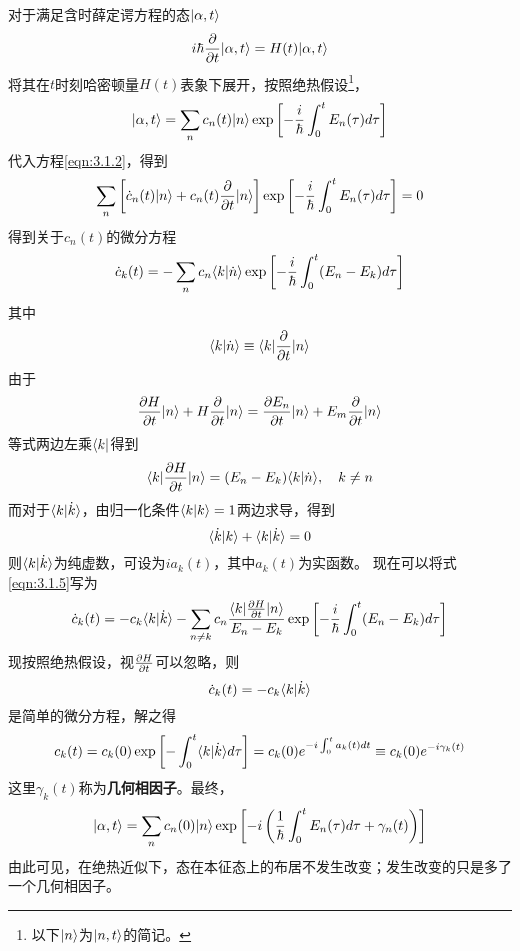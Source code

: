 对于满足含时薛定谔方程的态$ |\alpha,t\rangle $
\begin{equation}\label{eqn:3.1.2}
i\hbar\frac{\partial}{\partial t}|\alpha,t\rangle=H(t)|\alpha,t\rangle
\end{equation}
将其在$ t $时刻哈密顿量$ H(t) $表象下展开，按照绝热假设\footnote{以下$ |n\rangle $为$ |n,t\rangle $的简记。}，
\begin{equation}\label{key}
|\alpha,t\rangle=\sum_nc_n(t)|n\rangle\exp\left[-\frac{i}{\hbar}\int_0^tE_n(\tau)d\tau\right]
\end{equation}
代入方程\eqref{eqn:3.1.2}，得到
\begin{equation}\label{key}
\sum_n\left[\dot{c}_n(t)|n\rangle+c_n(t)\dfrac{\partial}{\partial t}|n\rangle\right]\exp\left[-\frac{i}{\hbar}\int_0^tE_n(\tau)d\tau\right]=0
\end{equation}
得到关于$ c_n(t) $的微分方程
\begin{equation}\label{eqn:3.1.5}
\dot{c}_k(t)=-\sum_nc_n\langle k|\dot{n}\rangle\exp\left[-\dfrac{i}{\hbar}\int_0^t(E_n-E_k)d\tau\right]
\end{equation}
其中
\begin{equation}\label{key}
\langle k|\dot{n}\rangle\equiv\langle k|\frac{\partial}{\partial t}|n\rangle
\end{equation}
由于
\begin{equation}\label{key}
\dfrac{\partial H}{\partial t}|n\rangle+H\dfrac{\partial}{\partial t}|n\rangle=\dfrac{\partial E_n}{\partial t}|n\rangle+E_m\dfrac{\partial}{\partial t}|n\rangle
\end{equation}
等式两边左乘$ \langle k| $得到
\begin{equation}\label{key}
\langle k|\dfrac{\partial H}{\partial t}|n\rangle=(E_n-E_k)\langle k|\dot{n}\rangle,\quad k\neq n
\end{equation}
而对于$ \langle k|\dot{k}\rangle $，由归一化条件$ \langle k|k\rangle=1 $两边求导，得到
\begin{equation}\label{key}
\langle \dot{k}|k\rangle+\langle k|\dot{k}\rangle=0
\end{equation}
则$ \langle k|\dot{k}\rangle $为纯虚数，可设为$ ia_k(t) $，其中$ a_k(t) $为实函数。
现在可以将式\eqref{eqn:3.1.5}写为
\begin{equation}\label{key}
\dot{c}_k(t)=-c_k\langle k|\dot{k}\rangle-\sum_{n\neq k}c_n\dfrac{\langle k|\frac{\partial H}{\partial t}|n\rangle}{E_n-E_k}\exp\left[-\dfrac{i}{\hbar}\int_0^t(E_n-E_k)d\tau\right]
\end{equation}
现按照绝热假设，视$ \frac{\partial H}{\partial t} $可以忽略，则
\begin{equation}\label{key}
\dot{c}_k(t)=-c_k\langle k|\dot{k}\rangle
\end{equation}
是简单的微分方程，解之得
\begin{equation}\label{key}
c_k(t)=c_k(0)\exp\left[-\int_0^t\langle k|\dot{k}\rangle d\tau\right]=c_k(0)e^{-i\int_0^ta_k(t)dt}\equiv c_k(0)e^{-i\gamma_k(t)}
\end{equation}
这里$ \gamma_k(t) $称为\textbf{几何相因子}。最终，
\begin{equation}\label{key}
|\alpha,t\rangle=\sum_nc_n(0)|n\rangle\exp\left[-i\left(\frac{1}{\hbar}\int_0^tE_n(\tau)d\tau+\gamma_n(t)\right)\right]
\end{equation}
由此可见，在绝热近似下，态在本征态上的布居不发生改变；发生改变的只是多了一个几何相因子。

